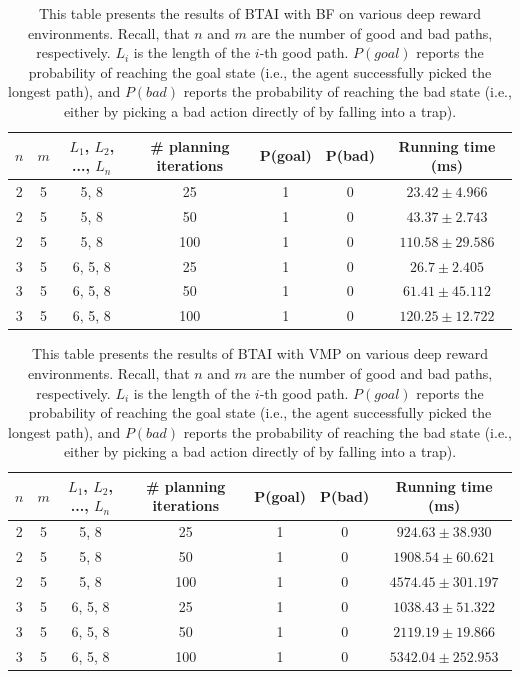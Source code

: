 \documentclass[twoside,11pt]{article}
\begin{document}
\begin{table}[H]
\centering
\begin{tabular}{ |c|c|c|c|c|c|c| }
 \hline
 $n$ & $m$ & $L_1$, $L_2$, ..., $L_n$  & \# planning iterations & P(goal) & P(bad) & Running time (ms)\\
 \hline
 2 & 5 & 5, 8 & 25 & 1 & 0 & $23.42 \pm 4.966$ \\
 \hline
 2 & 5 & 5, 8 & 50 & 1 & 0 & $43.37 \pm 2.743$\\
 \hline
 2 & 5 & 5, 8 & 100 & 1 & 0 & $110.58 \pm 29.586$\\
 \hline
 3 & 5 & 6, 5, 8 & 25 & 1 & 0 & $26.7 \pm 2.405$\\
 \hline
 3 & 5 & 6, 5, 8 & 50 & 1 & 0 & $61.41 \pm 45.112$\\
 \hline
 3 & 5 & 6, 5, 8 & 100 & 1 & 0 & $120.25 \pm 12.722$\\
 \hline
\end{tabular}
\caption{This table presents the results of BTAI with BF on various deep reward environments. Recall, that $n$ and $m$ are the number of good and bad paths, respectively. $L_i$ is the length of the $i$-th good path. $P(goal)$ reports the probability of reaching the goal state (i.e., the agent successfully picked the longest path), and $P(bad)$ reports the probability of reaching the bad state (i.e., either by picking a bad action directly of by falling into a trap).}
\label{tab:1}
\end{table}

\begin{table}[H]
\centering
\begin{tabular}{ |c|c|c|c|c|c|c| }
 \hline
 $n$ & $m$ & $L_1$, $L_2$, ..., $L_n$  & \# planning iterations & P(goal) & P(bad) & Running time (ms)\\
 \hline
 2 & 5 & 5, 8 & 25 & 1 & 0 & $924.63 \pm 38.930$\\
 \hline
 2 & 5 & 5, 8 & 50 & 1 & 0 & $1908.54 \pm 60.621$\\
 \hline
 2 & 5 & 5, 8 & 100 & 1 & 0 & $4574.45 \pm 301.197$\\
 \hline
 3 & 5 & 6, 5, 8 & 25 & 1 & 0 & $1038.43 \pm 51.322$\\
 \hline
 3 & 5 & 6, 5, 8 & 50 & 1 & 0 & $2119.19 \pm 19.866$\\
 \hline
 3 & 5 & 6, 5, 8 & 100 & 1 & 0 & $5342.04 \pm 252.953$\\
 \hline
\end{tabular}
\caption{This table presents the results of BTAI with VMP on various deep reward environments. Recall, that $n$ and $m$ are the number of good and bad paths, respectively. $L_i$ is the length of the $i$-th good path. $P(goal)$ reports the probability of reaching the goal state (i.e., the agent successfully picked the longest path), and $P(bad)$ reports the probability of reaching the bad state (i.e., either by picking a bad action directly of by falling into a trap).}
\label{tab:2}
\end{table}
\end{document}
